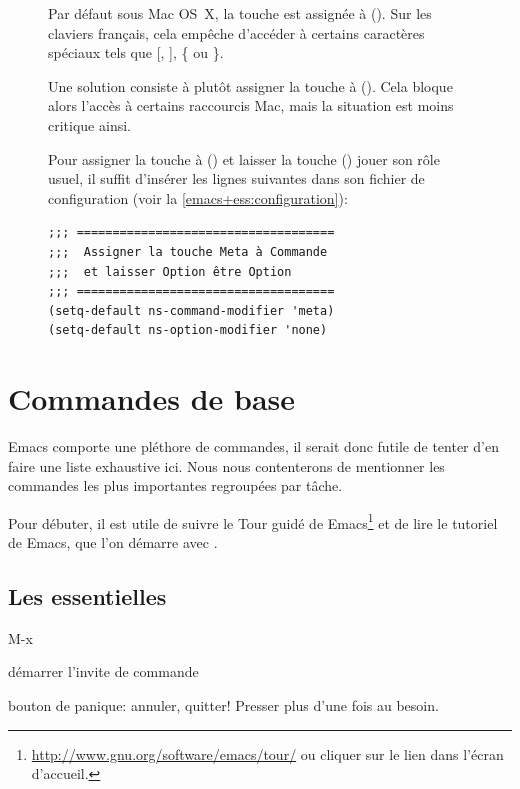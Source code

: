 \begin{figure}[t]
  \begin{osx}
    Par défaut sous Mac OS~X, la touche  est assignée à
     (\optkey). Sur les claviers français, cela empêche
    d'accéder à certains caractères spéciaux tels que [, ], \{ ou \}.

    Une solution consiste à plutôt assigner la touche  à
     (\cmdkey). Cela bloque alors l'accès à certains
    raccourcis Mac, mais la situation est moins critique ainsi.

    Pour assigner la touche  à  (\cmdkey) et
    laisser la touche  (\optkey) jouer son rôle usuel, il
    suffit d'insérer les lignes suivantes dans son fichier de
    configuration  (voir la
    \autoref{emacs+ess:configuration}):
\begin{verbatim}
;;; ====================================
;;;  Assigner la touche Meta à Commande
;;;  et laisser Option être Option
;;; ====================================
(setq-default ns-command-modifier 'meta)
(setq-default ns-option-modifier 'none)
\end{verbatim}
  \end{osx}
\end{figure}



\section{Commandes de base}
\label{emacs+ess:commandes}

Emacs comporte une pléthore de commandes, il serait donc futile de
tenter d'en faire une liste exhaustive ici. Nous nous contenterons de
mentionner les commandes les plus importantes regroupées par tâche.

Pour débuter, il est utile de suivre le Tour guidé de Emacs\footnote{%
  \url{http://www.gnu.org/software/emacs/tour/} ou cliquer sur le lien
  dans l'écran d'accueil.} %
et de lire le tutoriel de Emacs, que l'on démarre avec .

\subsection{Les essentielles}
\label{emacs+ess:commandes:essentielles}

\begin{ttscript}{M-x}
\item[\emacs{M-x}] démarrer l'invite de commande
\item[\emacs{C-g}] bouton de panique: annuler, quitter! Presser plus
  d'une fois au besoin.
\end{ttscript}

